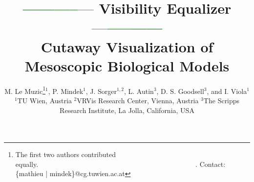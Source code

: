 
\usepackage{xcolor}



\title[Visibility Equalizer]%
      {\textcolor{darkgreen}{------}\textcolor{green}{-----}\textcolor{grey}{---} Visibility Equalizer \textcolor{grey}{---}\textcolor{green}{-----}\textcolor{darkgreen}{------} \\ Cutaway Visualization of Mesoscopic Biological Models}

\author[Le Muzic, Mindek et al.]
       {M. Le Muzic\thanks{The first two authors contributed equally.~~~~~~~~~~~~~~~~~~~~~~~~~~~~~~~~~~~~~~~~~~~~~~.
        Contact: \{mathieu | mindek\}@cg.tuwien.ac.at}$^{1}$,
        P. Mindek$^{1}$,
        J. Sorger$^{1,2}$,
        L. Autin$^{3}$,
        D. S. Goodsell$^{3}$,
        and I. Viola$^{1}$        
        \\
         $^1$TU Wien, Austria \hspace{4mm}$^2$VRVis Research Center, Vienna, Austria \hspace{4mm}$^3$The Scripps Research Institute, La Jolla, California, USA
       }



%




